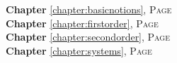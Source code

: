 
\begin{multicols}{2}
      \setlength{\parindent}{0pt}
      \footnotesize{

\textbf{Chapter} \ref{chapter:basicnotions}, \textsc{Page} \pageref{chapter:basicnotions} \\
\textbf{Chapter} \ref{chapter:firstorder}, \textsc{Page} \pageref{chapter:firstorder} \\
\textbf{Chapter} \ref{chapter:secondorder}, \textsc{Page} \pageref{chapter:secondorder} \\
\textbf{Chapter} \ref{chapter:systems}, \textsc{Page} \pageref{chapter:systems} \\

      }
\end{multicols}

